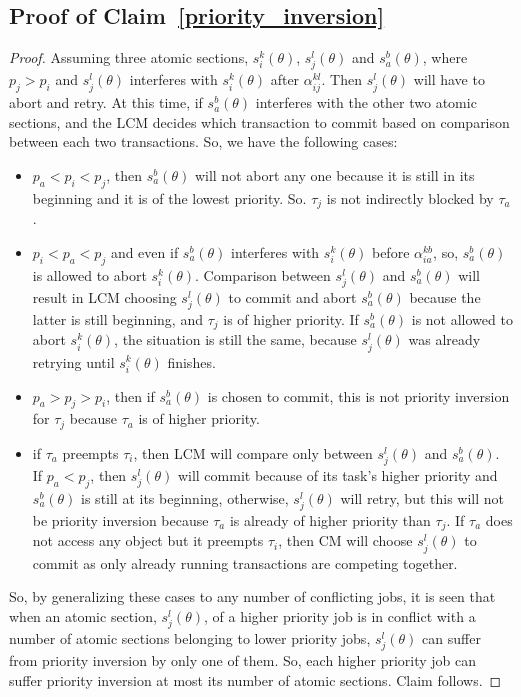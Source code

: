 \documentclass[conference]{sig-alternate}
\begin{document}
\subsection{\label{proof_priority_inversion} Proof of Claim~\ref{priority_inversion}}
\begin{proof}
Assuming three atomic sections, $s_i^k(\theta)$, $s_j^l(\theta)$ and $s_a^b(\theta)$, where $p_j > p_i$ and $s_j^l(\theta)$ interferes with $s_i^k(\theta)$ after $\alpha_{ij}^{kl}$. Then $s_j^l(\theta)$ will have to abort and retry. At this time, if $s_a^b(\theta)$ interferes with the other two atomic sections, and the LCM decides which transaction to commit based on comparison between each two transactions. So, we have the following cases:
\begin{itemize}
\item $p_a < p_i < p_j$, then $s_a^b(\theta)$ will not abort any one because it is still in its beginning and it is of the lowest priority. So. $\tau_j$ is not indirectly blocked by $\tau_a$.
\item $p_i<p_a<p_j$ and even if $s_a^b(\theta)$ interferes with $s_i^k(\theta)$ before $\alpha_{ia}^{kb}$, so, $s_a^b(\theta)$ is allowed to abort $s_i^k(\theta)$. Comparison between $s_j^l(\theta)$ and $s_a^b(\theta)$ will result in LCM choosing $s_j^l(\theta)$ to commit and abort $s_a^b(\theta)$ because the latter is still beginning, and $\tau_j$ is of higher priority. If $s_a^b(\theta)$ is not allowed to abort $s_i^k(\theta)$, the situation is still the same, because $s_j^l(\theta)$ was already retrying until $s_i^k(\theta)$ finishes.
\item $p_a>p_j>p_i$, then if $s_a^b(\theta)$ is chosen to commit, this is not priority inversion for $\tau_j$ because $\tau_a$ is of higher priority.
\item if $\tau_a$ preempts $\tau_i$, then LCM will compare only between $s_j^l(\theta)$ and $s_a^b(\theta)$. If $p_a<p_j$, then $s_j^l(\theta)$ will commit because of its task's higher priority and $s_a^b(\theta)$ is still at its beginning, otherwise, $s_j^l(\theta)$ will retry, but this will not be priority inversion because $\tau_a$ is already of higher priority than $\tau_j$. If $\tau_a$ does not access any object but it preempts $\tau_i$, then CM will choose $s_j^l(\theta)$ to commit as only already running transactions are competing together.
\end{itemize}
So, by generalizing these cases to any number of conflicting jobs, it is seen that when an atomic section, $s_j^l(\theta)$, of a higher priority job is in conflict with a number of atomic sections belonging to lower priority jobs, $s_j^l(\theta)$ can suffer from priority inversion by only one of them. So, each higher priority job can suffer priority inversion at most its number of atomic sections. Claim follows.
\end{proof}
\end{document}
